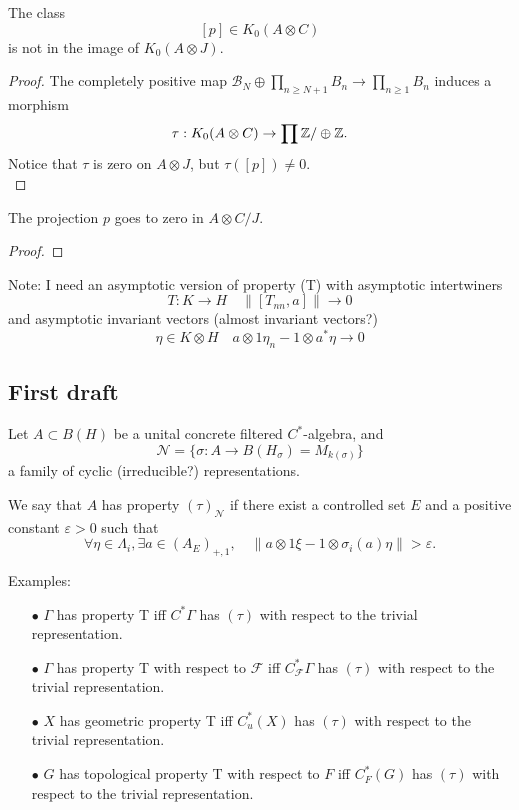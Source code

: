 \begin{prop}
The class \[ [p] \in K_0(A\otimes C)\]
is not in the image of $K_0(A\otimes J)$.
\end{prop}
\begin{proof}
The completely positive map $\mathcal B_N \oplus \prod_{n\geq N+1} B_n \rightarrow \prod_{n\geq 1} B_n$ induces a morphism 
\[\tau: K_0(A\otimes C)\rightarrow \prod \mathbb Z / \oplus \mathbb Z.\]
Notice that $\tau$ is zero on $A\otimes J$, but $\tau([p]) \neq 0$. \\
\end{proof}

\begin{prop}
The projection $p$ goes to zero in $A\otimes C/J$.
\end{prop}

\begin{proof}

\end{proof}

Note: I need an asymptotic version of property (T) with asymptotic intertwiners 
\[ T: K \rightarrow H \quad \| [T_{nn},a] \| \rightarrow 0\]
and asymptotic invariant vectors (almost invariant vectors?)
\[\eta \in K\otimes H \quad a\otimes 1 \eta_n - 1\otimes a^* \eta \rightarrow 0\]

\subsection{First draft}

Let $A \subset B(H)$ be a unital concrete filtered $C^*$-algebra, and 
\[\mathcal N = \{\sigma : A \rightarrow B(H_\sigma) = M_{k(\sigma)}\}\]
a family of cyclic (irreducible?) representations.
\begin{definition}
We say that $A$ has property $(\tau )_{\mathcal N}$ if there exist a controlled set $E$ and a positive constant $\varepsilon>0$ such that 
\[\forall \eta \in \Lambda_{i}, \exists a\in (A_E)_{+,1}, \quad \| a \otimes 1 \xi - 1 \otimes \sigma_i(a) \eta  \| > \varepsilon . \]
\end{definition}

Examples: 
\begin{itemize}
\item[$\bullet$] $\Gamma$ has property T iff $C^*\Gamma$ has $(\tau)$ with respect to the trivial representation.
\item[$\bullet$] $\Gamma$ has property T with respect to $\mathcal F$ iff $C_{\mathcal F}^*\Gamma$ has $(\tau)$ with respect to the trivial representation.
\item[$\bullet$] $X$ has geometric property T iff $C^*_u(X)$ has $(\tau)$ with respect to the trivial representation.
\item[$\bullet$] $G$ has topological property T with respect to $F$ iff $C^*_F(G)$ has $(\tau)$ with respect to the trivial representation.
\end{itemize}

